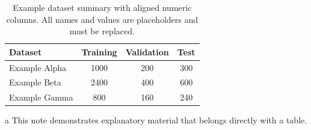 \begin{table}[htbp]
  \centering
  \caption[Example dataset summary.]{Example dataset summary with aligned numeric columns. All names and values are placeholders and must be replaced.}
  \label{tab:datasets}
  \begin{threeparttable}
  \begin{tabular}{@{}l S[table-format=4.0] S[table-format=3.0] S[table-format=3.0]@{}}
    \toprule
    \textbf{Dataset} & {\textbf{Training}} & {\textbf{Validation}} & {\textbf{Test}} \\
    \midrule
    Example Alpha & 1000 & 200 & 300 \\
    Example Beta & 2400 & 400 & 600 \\
    Example Gamma & 800 & 160 & 240 \\
    \bottomrule
  \end{tabular}
  \begin{tablenotes}[flushleft]\footnotesize
    \item[a] This note demonstrates explanatory material that belongs directly with a table.
  \end{tablenotes}
  \end{threeparttable}
\end{table}
